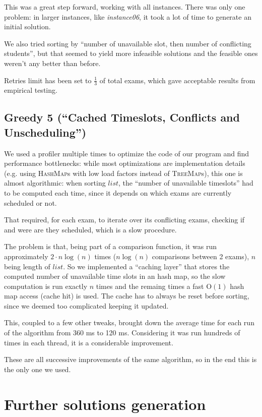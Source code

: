 \documentclass[11pt, a4paper, leqno]{article}
\begin{document}
	 This was a great step forward, working with all instances. There was only one problem: in larger instances, like \textit{instance06}, it took a lot of time to generate an initial solution.
	 
	 We also tried sorting by ``number of unavailable slot, then number of conflicting students'', but that seemed to yield more infeasible solutions and the feasible ones weren't any better than before.
	
	Retries limit has been set to $\frac{1}{3}$ of total exams, which gave acceptable results from empirical testing.
	
	\subsection{Greedy 5 (``Cached Timeslots, Conflicts and Unscheduling'')}
	
	We used a profiler multiple times to optimize the code of our program and find performance bottlenecks: while most optimizations are implementation details (e.g. using \textsc{HashMap}s with low load factors instead of \textsc{TreeMap}s), this one is almost algorithmic: when sorting $list$, the ``number of unavailable timeslots'' had to be computed each time, since it depends on which exams are currently scheduled or not.
	
	That required, for each exam, to iterate over its conflicting exams, checking if and were are they scheduled, which is a slow procedure.
	
	The problem is that, being part of a comparison function, it was run approximately $2\cdot n \log(n)$ times ($n \log(n)$ comparisons between 2 exams), $n$ being length of $list$. So we implemented a ``caching layer'' that stores the computed number of unavailable time slots in an hash map, so the slow computation is run exactly $n$ times and the remaing times a fast $\mathrm{O}(1)$ hash map access (cache hit) is used. The cache has to always be reset before sorting, since we deemed too complicated keeping it updated.
	
	This, coupled to a few other tweaks, brought down the average time for each run of the algorithm from 360 ms to 120 ms. Considering it was run hundreds of times in each thread, it is a considerable improvement.
	
	These are all successive improvements of the same algorithm, so in the end this is the only one we used.
	
	\section{Further solutions generation}
	
\end{document}
